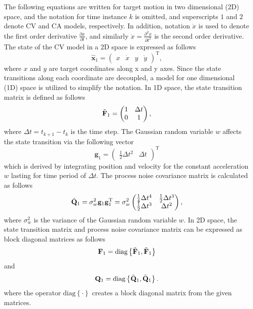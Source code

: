 \documentclass[english, 12pt, a4paper, elec, utf8, a-1b, online]{aaltothesis}
\renewcommand{\vec}[1]{\mathbf{#1}}
\newcommand{\transpose}[1]{#1^\text{T}}
\newcommand{\dt}{\Delta t}
\newcommand{\diag}[1]{\text{diag}\left\{ #1 \right\}}
\begin{document}
The following equations are written for target motion in two dimensional (2D) space, and
the notation for time instance $k$ is omitted, and superscripts $1$ and $2$ denote CV and CA models, respectively. 
In addition, notation $\dot{x}$ is used to denote the first order derivative $\frac{\partial x}{\partial t}$, and similarly $\ddot{x}=\frac{\partial^2 x}{\partial t^2}$ is the second order derivative.
The state of the CV model in a 2D space is expressed as follows
\begin{equation}\label{eq:x_mode1}
    \hat{\mathbf{x}}_1 =
        \transpose{
        \begin{pmatrix}
            x & \dot{x} & y & \dot{y}
    \end{pmatrix}},
\end{equation}
where $x$ and $y$ are target coordinates along x and y axes. 
Since the state transitions along each coordinate are decoupled, a model for one dimensional (1D) space is utilized to simplify the notation.
In 1D space, the state transition matrix is defined as follows
\begin{equation}\label{eq:f_mode1}
    \Tilde{\vec{F}}_1 =
    \begin{pmatrix}
        1 & \dt \\
        0 & 1  \\
    \end{pmatrix},
\end{equation}
where $\dt=t_{k+1} - t_k$ is the time step.
The Gaussian random variable $w$ affects the state transition via the following vector
\begin{equation}\label{eq:g_noise_mode1}
\vec{g}_1 =\transpose{\begin{pmatrix}
        \frac{1}{2} \dt^2 & \dt
    \end{pmatrix}}
\end{equation}
which is derived by integrating position and velocity for the constant acceleration $w$ lasting for time period of $\dt$.
The process noise covariance matrix is calculated as follows  
\begin{equation}
    \Tilde{\vec{Q}}_1 = \sigma_w^2 \vec{g}_1 \transpose{\vec{g}_1}
    = \sigma_w^2
    \begin{pmatrix}
        \frac{1}{4} \dt^4 & \frac{1}{2} \dt^3 \\ 
        \frac{1}{2} \dt^3 & \dt^2 \\ 
    \end{pmatrix},
\end{equation}
where $\sigma_w^2$ is the variance of the Gaussian random variable $w$.
In 2D space, the state transition matrix and process noise covariance matrix can be expressed as block diagonal matrices as follows 
\begin{equation}\label{eq:F_mode1}
\vec{F}_1 = \diag{\Tilde{\vec{F}}_1, \Tilde{\vec{F}}_1}
\end{equation}
and
\begin{equation}
    \vec{Q}_1 = \diag{\Tilde{\vec{Q}}_1, \Tilde{\vec{Q}}_1}.
\end{equation}
where the operator $\diag{\cdot}$ creates a block diagonal matrix from the given matrices.
\end{document}
